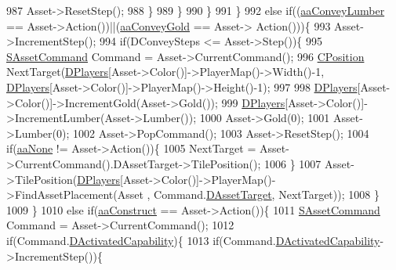 \begin{DoxyCode}
{{987                         Asset->ResetStep();
988                     \}
989                 \}
990             \}
991         \}
992         \textcolor{keywordflow}{else} \textcolor{keywordflow}{if}((\hyperlink{GameDataTypes_8h_ab47668e651a3032cfb9c40ea2d60d670a7b0954302f27f46b3fdf6fddd530d154}{aaConveyLumber} == Asset->Action())||(\hyperlink{GameDataTypes_8h_ab47668e651a3032cfb9c40ea2d60d670ae80ac4dde60023e0a1794e994db7000a}{aaConveyGold} == Asset->
      Action()))\{
993             Asset->IncrementStep();
994             \textcolor{keywordflow}{if}(DConveySteps <= Asset->Step())\{
995                 \hyperlink{structSAssetCommand}{SAssetCommand} Command = Asset->CurrentCommand();
996                 \hyperlink{classCPosition}{CPosition} NextTarget(\hyperlink{classCGameModel_a524436c3560b10e1c6d6fdd0b66565dc}{DPlayers}[Asset->Color()]->PlayerMap()->Width()-1,
      \hyperlink{classCGameModel_a524436c3560b10e1c6d6fdd0b66565dc}{DPlayers}[Asset->Color()]->PlayerMap()->Height()-1);
997                 
998                 \hyperlink{classCGameModel_a524436c3560b10e1c6d6fdd0b66565dc}{DPlayers}[Asset->Color()]->IncrementGold(Asset->Gold());
999                 \hyperlink{classCGameModel_a524436c3560b10e1c6d6fdd0b66565dc}{DPlayers}[Asset->Color()]->IncrementLumber(Asset->Lumber());
1000                 Asset->Gold(0);
1001                 Asset->Lumber(0);
1002                 Asset->PopCommand();
1003                 Asset->ResetStep();
1004                 \textcolor{keywordflow}{if}(\hyperlink{GameDataTypes_8h_ab47668e651a3032cfb9c40ea2d60d670ac17cc5a0035320c060d7f8074143b507}{aaNone} != Asset->Action())\{
1005                     NextTarget = Asset->CurrentCommand().DAssetTarget->TilePosition();
1006                 \}
1007                 Asset->TilePosition(\hyperlink{classCGameModel_a524436c3560b10e1c6d6fdd0b66565dc}{DPlayers}[Asset->Color()]->PlayerMap()->FindAssetPlacement(Asset
      , Command.\hyperlink{structSAssetCommand_a3d9b43f6e59c386c48c41a65448a0c39}{DAssetTarget}, NextTarget));
1008             \}
1009         \}
1010         \textcolor{keywordflow}{else} \textcolor{keywordflow}{if}(\hyperlink{GameDataTypes_8h_ab47668e651a3032cfb9c40ea2d60d670a7ef6b863f66dd7dcc95a199cd758ae1d}{aaConstruct} == Asset->Action())\{
1011             \hyperlink{structSAssetCommand}{SAssetCommand} Command = Asset->CurrentCommand();
1012             \textcolor{keywordflow}{if}(Command.\hyperlink{structSAssetCommand_ad8beda19520811cc70fe1eab16c774dd}{DActivatedCapability})\{
1013                 \textcolor{keywordflow}{if}(Command.\hyperlink{structSAssetCommand_ad8beda19520811cc70fe1eab16c774dd}{DActivatedCapability}->IncrementStep())\{
}}
\end{DoxyCode}
